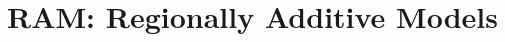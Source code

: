\documentclass[12pt]{article}
\newcommand{\xb}{\mathbf{x}}
\begin{document}
\section{RAM: Regionally Additive Models}




%
%
%
%
\end{document}
